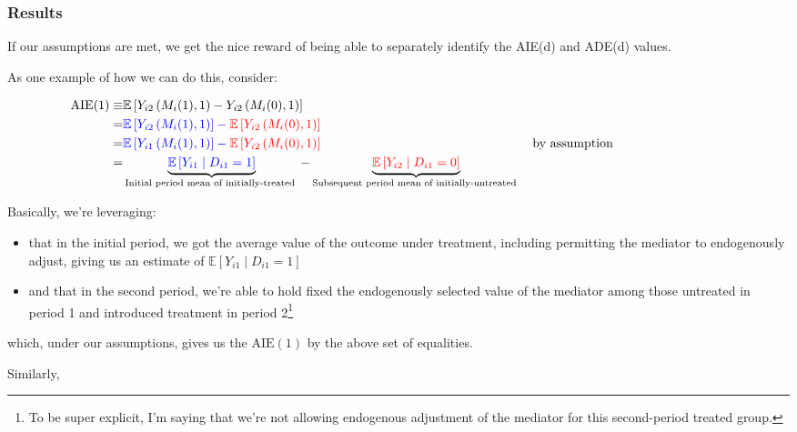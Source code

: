 \documentclass[10pt]{article}
\begin{document}
\subsubsection{Results}

If our assumptions are met, we get the nice
reward of being able to separately identify 
the AIE(d) and ADE(d) values.

As one example of how we can do this, consider:

\begin{align}
    \text{AIE}(1) \equiv &\mathbb{E}\left[Y_{i 2}\left(M_i(1), 1\right)-Y_{i 2}\left(M_i(0), 1\right)\right] \\
    = &\color{blue}{\mathbb{E}\left[Y_{i 2}\left(M_i(1), 1\right)\right]} - \color{red}{\mathbb{E}\left[Y_{i 2}\left(M_i(0), 1\right)\right]} \\
    = &\color{blue}{\mathbb{E}\left[Y_{i 1}\left(M_i(1), 1\right)\right]} - \color{red}{\mathbb{E}\left[Y_{i 2}\left(M_i(0), 1\right)\right]} && \parbox[t]{5cm}{\raggedright by assumption} \\
    = &\underbrace{\color{blue}{\mathbb{E}\left[Y_{i 1} \mid D_{i 1}=1\right]}}_{\text {Initial period mean of initially-treated }}-\underbrace{\color{red}{\mathbb{E}\left[Y_{i 2} \mid D_{i 1}=0\right]}}_{\text {Subsequent period mean of initially-untreated }}
\end{align}

Basically, we're leveraging: 
\begin{itemize}
    \item that in the initial period, 
        we got the average value of the outcome under treatment, 
        including permitting the mediator to endogenously adjust, 
        giving us an estimate of $\mathbb{E}\left[Y_{i 1} \mid D_{i 1}=1\right]$
    \item and that in the second period, we're able to hold fixed 
        the endogenously selected value of the mediator among 
        those untreated in period 1 and introduced treatment in period 2\footnote{
            To be super explicit, I'm saying that we're not allowing endogenous 
            adjustment of the mediator for this second-period treated group.
        }
\end{itemize}

which, under our assumptions, gives us the 
$\text{AIE}(1)$ by the above set of equalities.

Similarly, 
\end{document}

